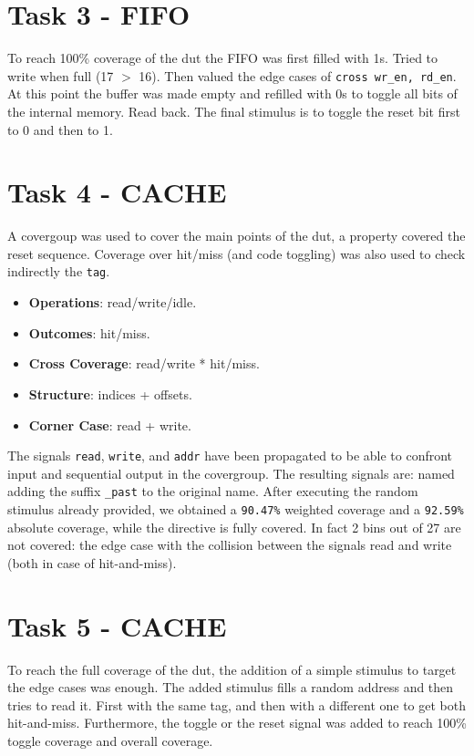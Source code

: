 \section{Task 3 - FIFO}

To reach 100\% coverage of the dut the FIFO was first filled with 1s.
Tried to write when full (17 $>$ 16).
Then valued the edge cases of \texttt{cross wr\_en, rd\_en}. 
At this point the buffer was made empty and refilled with 0s to toggle all bits of the internal memory. 
Read back.
The final stimulus is to toggle the reset bit first to 0 and then to 1.



\section{Task 4 - CACHE}

A covergoup was used to cover the main points of the dut, a property covered the reset sequence.
Coverage over hit/miss (and code toggling) was also used to check indirectly the \texttt{tag}.

\begin{itemize}
	\item \textbf{Operations}: read/write/idle.
	\item \textbf{Outcomes}: hit/miss.
	\item \textbf{Cross Coverage}: read/write * hit/miss.
	\item \textbf{Structure}: indices + offsets.
	\item \textbf{Corner Case}: read + write.
\end{itemize}

The signals \texttt{read}, \texttt{write}, and \texttt{addr} have been propagated to be able to confront input and sequential output in the covergroup.
The resulting signals are: named adding the suffix \texttt{\_past} to the original name.
After executing the random stimulus already provided, we obtained a \texttt{90.47\%} weighted coverage and a \texttt{92.59\%} absolute coverage, while the directive is fully covered.
In fact 2 bins out of 27 are not covered: the edge case with the collision between the signals read and write (both in case of hit-and-miss).



\section{Task 5 - CACHE}

To reach the full coverage of the dut, the addition of a simple stimulus to target the edge cases was enough.
The added stimulus fills a random address and then tries to read it. First with the same tag, and then with a different one to get both hit-and-miss.
Furthermore, the toggle or the reset signal was added to reach 100\% toggle coverage and overall coverage.

